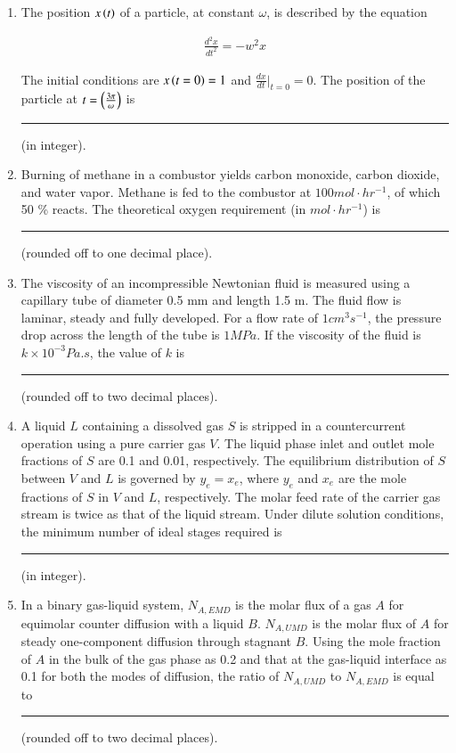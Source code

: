 \documentclass[journal,12pt,onecolumn]{IEEEtran}
\theoremstyle{remark}
\begin{document}
\begin{enumerate}
    \item The position $x\left(t\right)$ of a particle, at constant $\omega$, is described by the equation

    \begin{align*}
        \frac{d^{2}x}{dt^{2}} = -w^2x
    \end{align*}

    The initial conditions are $x\left(t = 0\right) = 1$ and $\frac{dx}{dt}|_{t=0} = 0$. The position of the particle at $t = \left(\frac{3\pi}{\omega}\right)$ is \rule{40pt}{0.1mm} (in integer).

\hfill{}
    \item Burning of methane in a combustor yields carbon monoxide, carbon dioxide, and water vapor. Methane is fed to the combustor at $100 mol\cdot hr^{-1}$, of which 50 \% reacts. The theoretical oxygen requirement (in $mol\cdot hr^{-1}$) is \rule{40pt}{0.1mm} (rounded off to one decimal place).

\hfill{}
    \item The viscosity of an incompressible Newtonian fluid is measured using a capillary tube of diameter 0.5 mm and length 1.5 m. The fluid flow is laminar, steady and fully developed. For a flow rate of $1cm^3s^{-1}$, the pressure drop across the length of the tube is $1MPa$. If the viscosity of the fluid is $k\times 10^{-3}Pa.s$, the value of $k$ is \rule{40pt}{0.1mm} (rounded off to two decimal places).

\hfill{}
    \item A liquid $L$ containing a dissolved gas $S$ is stripped in a countercurrent operation
    using a pure carrier gas $V$. The liquid phase inlet and outlet mole fractions of $S$ are
    0.1 and 0.01, respectively. The equilibrium distribution of $S$ between $V$ and $L$ is
    governed by $y_e = x_e$, where $y_e$ and $x_e$ are the mole fractions of $S$ in $V$ and $L$,
    respectively. The molar feed rate of the carrier gas stream is twice as that of the liquid
    stream. Under dilute solution conditions, the minimum number of ideal stages required is \rule{40pt}{0.1mm} (in integer).

    \hfill{}
    \item In a binary gas-liquid system, $N_{A,EMD}$ is the molar flux of a gas $A$ for equimolar
    counter diffusion with a liquid $B$. $N_{A,UMD}$ is the molar flux of $A$ for steady one-component
    diffusion through stagnant $B$. Using the mole fraction of $A$ in the bulk of the gas phase
    as 0.2 and that at the gas-liquid interface as 0.1 for both the modes of diffusion, the ratio of
    $N_{A,UMD}$ to $N_{A,EMD}$ is equal to \rule{40pt}{0.1mm} (rounded off to two decimal places).


\end{enumerate}
\end{document}
